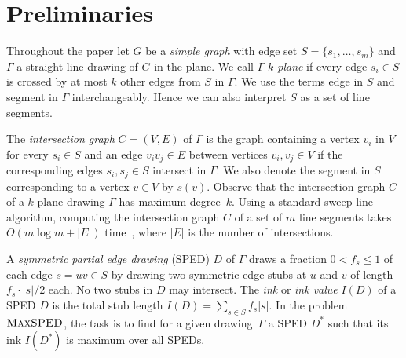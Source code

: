 \documentclass[a4paper,english,numberwithinsect]{eurocg18}
\newcommand{\maxsped}{\ensuremath{\textsc{MaxSPED}}\xspace}
\begin{document}
\section{Preliminaries}\label{sec:preliminaries}

Throughout the paper let $ G $ be a \emph{simple graph} with edge set $ S = \{s_1,\dots,s_m\}$ and $ \Gamma $ a straight-line drawing of $ G $ in the plane. We call $ \Gamma $ \emph{$ k $-plane} if every edge $ s_i \in S $ is crossed by at most $ k $ other edges from $ S $ in $ \Gamma $. We use the terms edge in $ S $ and segment in $ \Gamma $ interchangeably. %
Hence we can also interpret $S$ as a set of line segments.

The \emph{intersection graph} $ C = (V,E) $ of $ \Gamma $ is the graph containing a vertex $v_i$ in $ V $ for every $ s_i \in S $ and an edge $ v_i v_j \in E $ between vertices $ v_i, v_j \in V $ if the corresponding edges $ s_i, s_j \in S $ intersect in $ \Gamma $. 
We also denote the segment in $S$ corresponding to a vertex $v \in V$ by $s(v)$.
Observe that the intersection graph $ C $ of a $ k $-plane drawing $ \Gamma $ has maximum degree~$ k $.  
%
Using a standard sweep-line algorithm, computing the intersection graph $C$ of a set of $m$ line segments takes $O(m \log m + |E|)$ time~\cite{bcko-cgaa-08}, where $|E|$ is  the number of intersections.

A \emph{symmetric partial edge drawing} (SPED) $D$ of $\Gamma$ draws a fraction $0 < f_s \le 1$ of each edge $s = uv \in S$ by drawing two symmetric edge stubs at $u$ and $v$ of length $f_s \cdot |s|/2$ each. 
No two stubs in $D$ may intersect.
The \emph{ink} or \emph{ink value}  $I(D)$ of a SPED $D$ is the total stub length $I(D) = \sum_{s \in S} f_s |s|$.
In the problem \maxsped, the task is to find for a given drawing~$\Gamma$ a SPED $D^*$ such that its ink $I(D^*)$ is maximum over all SPEDs.
\end{document}
